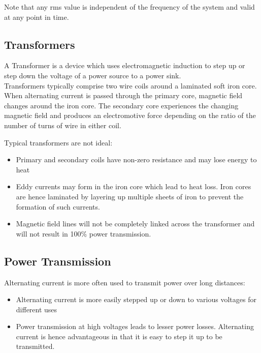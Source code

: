 \documentclass[../main]{subfiles}
\begin{document}
	Note that any rms value is independent of the frequency of the system and valid at any point in time.\\

	\subsection{Transformers}

	A Transformer is a device which uses electromagnetic induction to step up or step down the voltage of a power source to a power sink. \\

	Transformers typically comprise two wire coils around a laminated soft iron core. When alternating current is passed through the primary core, magnetic field changes around the iron core. The secondary core experiences the changing magnetic field and produces an electromotive force depending on the ratio of the number of turns of wire in either coil. \\


	Typical transformers are not ideal:
	\begin{itemize}
		\item Primary and secondary coils have non-zero resistance and may lose energy to heat
		\item Eddy currents may form in the iron core which lead to heat loss. Iron cores are hence laminated by layering up multiple sheets of iron to prevent the formation of such currents.
		\item Magnetic field lines will not be completely linked across the transformer and will not result in 100\% power transmission.
	\end{itemize}

	\subsection{Power Transmission}

	Alternating current is more often used to transmit power over long distances:
	\begin{itemize}
		\item Alternating current is more easily stepped up or down to various voltages for different uses
		\item Power transmission at high voltages leads to lesser power losses. Alternating current is hence advantageous in that it is easy to step it up to be transmitted.
	\end{itemize}
\end{document}
